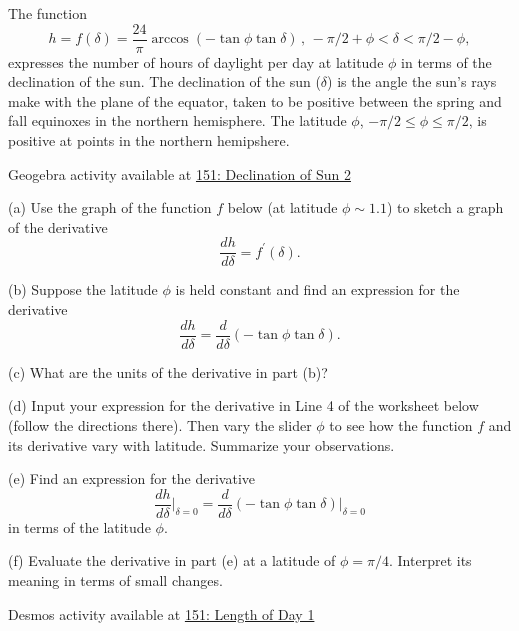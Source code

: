 \documentclass{ximera}
\begin{document}
\begin{question}  \label{Q:er43455}
The function
\[
    h = f(\delta) = \frac{24}{\pi} \arccos(-\tan\phi \tan\delta) \, , \, -\pi/2+\phi < \delta < \pi/2-\phi ,
\]
expresses the number of hours of daylight per day at latitude $\phi$ in terms of the declination of the sun. The declination of the sun ($\delta$) is the angle the sun's rays make with the plane of the equator, taken to be positive between the spring and fall equinoxes in the northern hemisphere. The latitude $\phi$, $-\pi/2 \leq \phi \leq \pi/2$, is positive at points in the northern hemipshere.

\begin{onlineOnly}
    \begin{center}
\end{center}
\end{onlineOnly}

Geogebra activity available at \href{https://www.geogebra.org/classic/vnhrutwu}{151: Declination of Sun 2}


(a) Use the graph of the function $f$ below (at latitude $\phi \sim 1.1$) to sketch a graph of the derivative
\[
   \frac{dh}{d\delta} = f^\prime(\delta) .
\]

(b) Suppose the latitude $\phi$ is held constant and find an expression for the derivative 
\[
   \frac{dh}{d\delta} = \frac{d}{d\delta} \left(  -\tan\phi \tan \delta    \right).
\]

(c) What are the units of the derivative in part (b)?

(d) Input your expression for the derivative in Line 4 of the worksheet below (follow the directions there). Then vary the slider $\phi$ to see how the function $f$ and its derivative vary with latitude. Summarize your observations.

(e) Find an expression for the derivative 
\[
   \frac{dh}{d\delta}\Big|_{\delta = 0} =  \frac{d}{d\delta} \left(  -\tan\phi \tan \delta    \right)\Big|_{\delta =0}
\]
in terms of the latitude $\phi$. 

(f) Evaluate the derivative in part (e) at a latitude of $\phi =\pi/4$. Interpret its meaning in terms of small changes.

\begin{onlineOnly}
    \begin{center}
\end{center}
\end{onlineOnly}

Desmos activity available at \href{https://www.desmos.com/calculator/ifomatkcta}{151: Length of Day 1}


\end{question}
\end{document}
